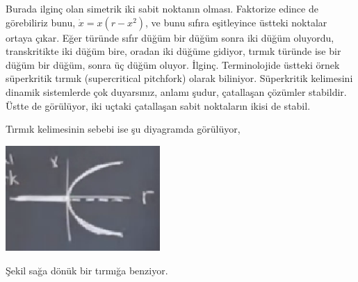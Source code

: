\documentclass[12pt,fleqn]{article}\usepackage{../../common}
\begin{document}
Burada ilginç olan simetrik iki sabit noktanın olması. Faktorize edince de
görebiliriz bunu, $\dot{x}=x(r-x^2)$, ve bunu sıfıra eşitleyince üstteki
noktalar ortaya çıkar. Eğer türünde sıfır düğüm bir düğüm sonra iki düğüm
oluyordu, transkritikte iki düğüm bire, oradan iki düğüme gidiyor, tırmık
türünde ise bir düğüm bir düğüm, sonra üç düğüm oluyor. İlginç. Terminolojide
üstteki örnek süperkritik tırmık (supercritical pitchfork) olarak
biliniyor. Süperkritik kelimesini dinamik sistemlerde çok duyarsınız, anlamı
şudur, çatallaşan çözümler stabildir. Üstte de görülüyor, iki uçtaki çatallaşan
sabit noktaların ikisi de stabil. 

Tırmık kelimesinin sebebi ise şu diyagramda görülüyor,

\includegraphics[height=4cm]{02_22.png}

Şekil sağa dönük bir tırmığa benziyor. 
\end{document}
